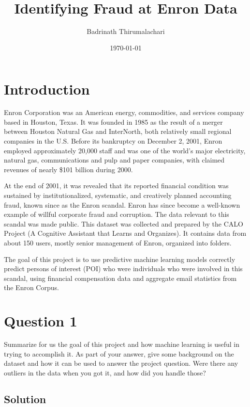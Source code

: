 \documentclass[12pt]{article}%
\begin{document}
\title{Identifying Fraud at Enron Data}
\author{Badrinath Thirumalachari}
\date{\today}
\maketitle 
 

\section*{Introduction}

Enron Corporation was an American energy, commodities, and services company based in Houston, Texas. It was founded in 1985 as the result of a merger between Houston Natural Gas and InterNorth, both relatively small regional companies in the U.S. Before its bankruptcy on December 2, 2001, Enron employed approximately 20,000 staff and was one of the world's major electricity, natural gas, communications and pulp and paper companies, with claimed revenues of nearly \$101 billion during 2000.

At the end of 2001, it was revealed that its reported financial condition was sustained by institutionalized, systematic, and creatively planned accounting fraud, known since as the Enron scandal. Enron has since become a well-known example of willful corporate fraud and corruption. The data relevant to this scandal was made public. This dataset was collected and prepared by the CALO Project (A Cognitive Assistant that Learns and Organizes). It contains data from about 150 users, mostly senior management of Enron, organized into folders.

The goal of this project is to use predictive machine learning models correctly predict persons of interest (POI) who were individuals who were involved in this scandal, using financial compensation data and aggregate email statistics from the Enron Corpus.

\newpage
\section*{Question 1}

Summarize for us the goal of this project and how machine learning is useful in trying to accomplish it. As part of your answer, give some background on the dataset and how it can be used to answer the project question. Were there any outliers in the data when you got it, and how did you handle those?

\subsection*{Solution}
\end{document}
